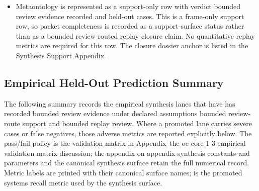 \begin{itemize}[leftmargin=1.6em,nosep]
\item Metaontology is represented as a support-only row with verdict bounded review evidence recorded and  held-out cases. This is a frame-only support row, so packet completeness is recorded as a support-surface status rather than as a bounded review-routed replay closure claim. No quantitative replay metrics are required for this row. The closure dossier anchor is listed in the Synthesis Support Appendix.
\end{itemize}

\subsection{Empirical Held-Out Prediction Summary}
The following summary records the empirical synthesis lanes that have has recorded bounded review evidence under declared assumptions bounded review-route support and bounded replay review.
Where a promoted lane carries severe cases or false negatives, those adverse metrics are reported explicitly below. The pass/fail policy is the validation matrix in Appendix~the oc core 1 3 empirical validation matrix discussion; the appendix on appendix synthesis constants and parameters and the canonical synthesis surface retain the full numerical record.
Metric labels are printed with their canonical surface names;  is the promoted systems recall metric used by the synthesis surface.

